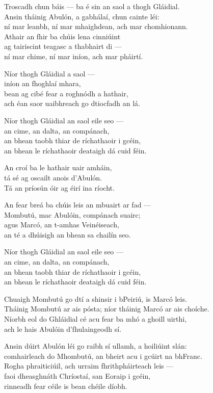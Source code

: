 \begin{lyrics}
Troscadh chun báis — ba é sin an saol a thogh Gláidial.\\
Ansin tháinig Abulón, a gabhálaí, chun cainte léi:\\
ní mar leanbh, ní mar mhaighdean, ach mar chomhionann.\\
Athair an fhir ba chúis lena cinniúint\\
ag tairiscint teagasc a thabhairt di —\\
ní mar chime, ní mar iníon, ach mar pháirtí.

Níor thogh Gláidial a saol —\\
iníon an fhoghlaí mhara,\\
bean ag cibé fear a roghnódh a hathair,\\
ach éan saor uaibhreach go dtiocfadh an lá.

Níor thogh Gláidial an saol eile seo —\\
an cime, an dalta, an compánach,\\
an bhean taobh thiar de ríchathaoir i gcéin,\\
an bhean le ríchathaoir deataigh dá cuid féin.

An croí ba le hathair uair amháin,\\
tá sé ag oscailt anois d'Abulón.\\
Tá an príosún óir ag éirí ina ríocht.

An fear breá ba chúis leis an mbuairt ar fad —\\
Mombutú, mac Abulóin, compánach suairc;\\
agus Marcó, an t-amhas Veinéiseach,\\
an té a dhúisigh an bhean sa chailín seo.


Níor thogh Gláidial an saol eile seo —\\
an cime, an dalta, an compánach,\\
an bhean taobh thiar de ríchathaoir i gcéin,\\
an bhean le ríchathaoir deataigh dá cuid féin.

Chuaigh Mombutú go dtí a shinsir i bPeiriú, is Marcó leis.\\
Tháinig Mombutú ar ais pósta; níor tháinig Marcó ar ais choíche.\\
Níorbh eol do Ghláidial cé acu fear ba mhó a ghoill uirthi,\\
ach le hais Abulóin d'fhulaingeodh sí.

Ansin dúirt Abulón léi go raibh sí ullamh, a hoiliúint slán:\\
comhairleach do Mhombutú, an bheirt acu i gcúirt na bhFranc.\\
Rogha phraiticiúil, ach urraim fhrithpháirteach leis —\\
faoi dheasghnáth Chríostaí, san Eoraip i gcéin,\\
rinneadh fear céile is bean chéile díobh.


\end{lyrics}
